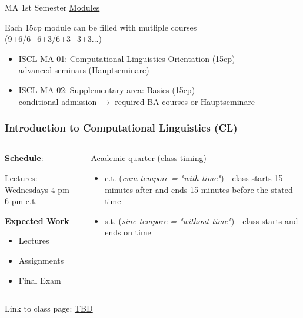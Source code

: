 \documentclass[aspectratio=169,hyperref={unicode},xcolor={dvipsnames}]{beamer}
\begin{document}
\begin{frame}{MA 1st Semester \underline{Modules}}
	\begin{center}Each 15cp module can be filled with mutliple courses\\
	(9+6/6+6+3/6+3+3+3...)\end{center}
	
\begin{itemize}

	\item ISCL-MA-01: Computational Linguistics Orientation (15cp)
	\\advanced seminars (Hauptseminare)\\
	\item ISCL-MA-02: Supplementary area: Basics (15cp)\\conditional admission $\rightarrow$ required BA courses or Hauptseminare
\end{itemize}	
\end{frame}

\begin{frame}{}
\frametitle{Introduction to Computational Linguistics \hspace{5.5cm} (CL)}
\begin{columns}
	\begin{column}{0.5\linewidth}
		\textbf{Schedule}:
		
		Lectures: Wednesdays 4 pm - 6 pm c.t.
		\newline
		
		\textbf{Expected Work}
		\begin{itemize}
			\item Lectures
			\item Assignments
			\item Final Exam
		\end{itemize}

   	\end{column}
	\begin{column}{0.5\linewidth}
	\begin{alertblock}{Academic quarter (class timing)}
	\begin{itemize}
	 \item c.t. (\textit{cum tempore = "with time"}) - class starts 15 minutes after and ends 15 minutes before the stated time
	 \item s.t. (\textit{sine tempore = "without time"}) - class starts and ends on time
	 \end{itemize}
	 \end{alertblock}
	\end{column}
\end{columns}
\begin{center}
	Link to class page: \url{TBD}
\end{center}
\end{frame}
\end{document}
